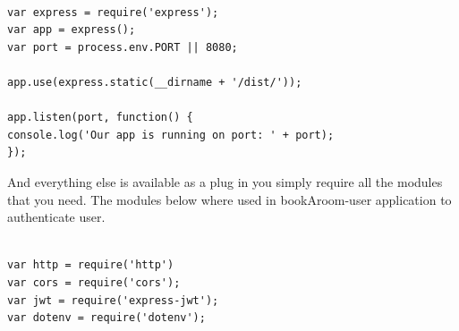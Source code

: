 \begin{verbatim}

var express = require('express');
var app = express();
var port = process.env.PORT || 8080;

app.use(express.static(__dirname + '/dist/'));

app.listen(port, function() {
console.log('Our app is running on port: ' + port);
});

\end{verbatim}
\bigbreak
And everything else is available as a plug in you simply require all the modules that you need. The modules below where used in bookAroom-user application to authenticate user.

\begin{verbatim}

var http = require('http')
var cors = require('cors');
var jwt = require('express-jwt');
var dotenv = require('dotenv');

\end{verbatim}


